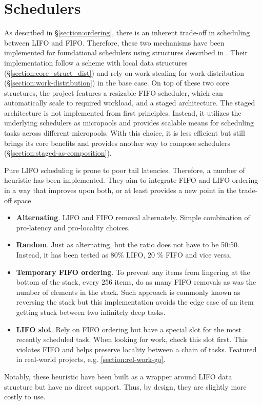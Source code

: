 \documentclass[12pt,a4paper,twoside]{report}
\begin{document}
\section{Schedulers}
\label{section:impl-schedulers}
As described in \S\ref{section:ordering}, there is an inherent trade-off in scheduling between LIFO and FIFO. Therefore, these two mechanisms have been implemented for foundational schedulers using structures described in . Their implementation follow a scheme with local data structures (\S\ref{section:core_struct_dist}) and rely on work stealing for work distribution (\S\ref{section:work-distribution}) in the base case. On top of these two core structures, the project features a resizable FIFO scheduler, which can automatically scale to required workload, and a staged architecture. The staged architecture is not implemented from first principles. Instead, it utilizes the underlying schedulers as micropools and provides scalable means for scheduling tasks across different micropools. With this choice, it is less efficient but still brings its core benefits and provides another way to compose schedulers (\S\ref{section:staged-as-composition}).

\label{paragraph:lifo-heuristics}
Pure LIFO scheduling is prone to poor tail latencies. Therefore, a number of heuristic has been implemented. They aim to integrate FIFO and LIFO ordering in a way that improves upon both, or at least provides a new point in the trade-off space.
\begin{itemize}
    \item \textbf{Alternating}. LIFO and FIFO removal alternately. Simple combination of pro-latency and pro-locality choices. 
    \item \textbf{Random}. Just as alternating, but the ratio does not have to be 50:50. Instead, it has been tested as 80\% LIFO, 20 \% FIFO and vice versa.  
    \item \textbf{Temporary FIFO ordering}. To prevent any items from lingering at the bottom of the stack, every 256 items, do as many FIFO removals as was the number of elements in the stack. Such approach is commonly known as reversing the stack but this implementation avoids the edge case of an item getting stuck between two infinitely deep tasks.
    \item \textbf{LIFO slot}. Rely on FIFO ordering but have a special slot for the most recently scheduled task. When looking for work, check this slot first. This violates FIFO and helps preserve locality between a chain of tasks. Featured in real-world projects, e.g. \ref{section:rel-work-go}. 
\end{itemize}
Notably, these heuristic have been built as a wrapper around LIFO data structure but have no direct support. Thus, by design, they are slightly more costly to use. 
\end{document}
